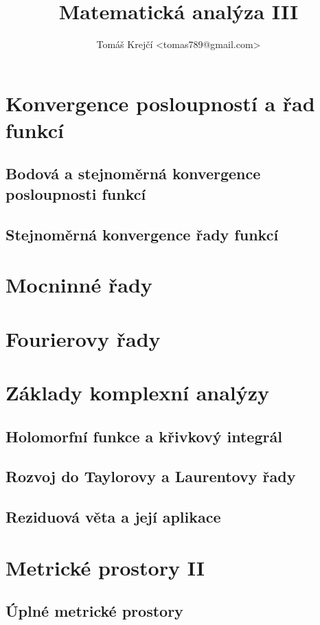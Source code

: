 \documentclass[12pt,a4paper]{article}
\title{Matematická analýza III}
\author{Tomáš Krejčí <tomas789@gmail.com>}
\newcounter{vety}
\begin{document}
\maketitle

\setcounter{section}{9}
\section{Konvergence posloupností a řad funkcí}

\subsection{Bodová a stejnoměrná konvergence posloupnosti funkcí}



\subsection{Stejnoměrná konvergence řady funkcí}



\pagebreak
\setcounter{vety}{0}
\section{Mocninné řady}



\pagebreak
\setcounter{vety}{0}
\section{Fourierovy řady}



\pagebreak
\setcounter{vety}{0}
\section{Základy komplexní analýzy}



\subsection{Holomorfní funkce a křivkový integrál}



\subsection{Rozvoj do Taylorovy a Laurentovy řady}



\subsection{Reziduová věta a její aplikace}



\pagebreak
\setcounter{vety}{0}
\section{Metrické prostory II}



\addtocounter{subsection}{1}
\subsection{Úplné metrické prostory}


\end{document}
